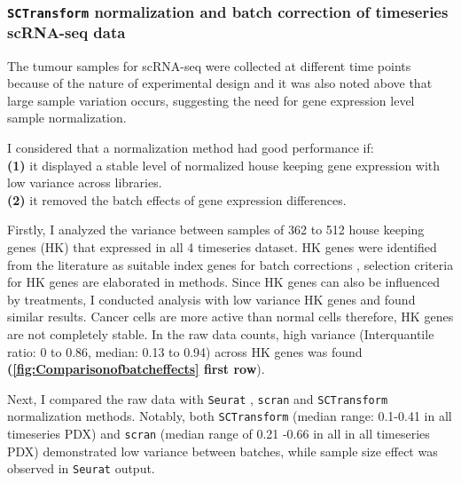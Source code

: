 \subsubsection{\texttt{SCTransform} normalization and batch correction of timeseries scRNA-seq data}
The tumour samples for scRNA-seq were collected at different time points because of the nature of experimental design and it was also noted above that large sample variation occurs, suggesting the need for gene expression level sample normalization. 

I considered that a normalization method had good performance if:
\\
\textbf{(1)} it displayed a stable level of normalized house keeping gene expression with low variance across libraries.
\\
\textbf{(2)} it removed the batch effects of gene expression differences. 

Firstly, I analyzed the variance between samples of 362 to 512 house keeping genes (HK) that expressed in all 4 timeseries dataset. HK genes were identified from the literature as suitable index genes for batch corrections \cite{lin2019evaluating}, selection criteria for HK genes are elaborated in methods.
Since HK genes can also be influenced by treatments,
I conducted analysis with low variance HK genes and found similar results.
Cancer cells are more active than normal cells therefore, HK genes are not completely stable. In the raw data counts, high variance (Interquantile ratio: 0 to 0.86, median: 0.13 to 0.94) across HK genes was found \textbf{(\autoref{fig:Comparisonofbatcheffects} first row}).

Next, I compared the raw data with \texttt{Seurat} \cite{butler2018integrating}, \texttt{scran} \cite{lun2016pooling} and \texttt{SCTransform} \cite{hafemeister2019normalization} normalization methods. 
Notably, both \texttt{SCTransform} (median range: 0.1-0.41 in all timeseries PDX) and \texttt{scran} (median range of 0.21 -0.66 in all in all timeseries PDX) demonstrated low variance between batches, while sample size effect was observed in \texttt{Seurat} output.

